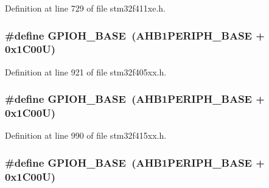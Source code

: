 Definition at line 729 of file stm32f411xe.\+h.

\subsubsection[{\texorpdfstring{G\+P\+I\+O\+H\+\_\+\+B\+A\+SE}{GPIOH_BASE}}]{\setlength{\rightskip}{0pt plus 5cm}\#define G\+P\+I\+O\+H\+\_\+\+B\+A\+SE~({\bf A\+H\+B1\+P\+E\+R\+I\+P\+H\+\_\+\+B\+A\+SE} + 0x1\+C00\+U)}\hypertarget{group___peripheral__registers__structures_gaee4716389f3a1c727495375b76645608}{}\label{group___peripheral__registers__structures_gaee4716389f3a1c727495375b76645608}


Definition at line 921 of file stm32f405xx.\+h.

\subsubsection[{\texorpdfstring{G\+P\+I\+O\+H\+\_\+\+B\+A\+SE}{GPIOH_BASE}}]{\setlength{\rightskip}{0pt plus 5cm}\#define G\+P\+I\+O\+H\+\_\+\+B\+A\+SE~({\bf A\+H\+B1\+P\+E\+R\+I\+P\+H\+\_\+\+B\+A\+SE} + 0x1\+C00\+U)}\hypertarget{group___peripheral__registers__structures_gaee4716389f3a1c727495375b76645608}{}\label{group___peripheral__registers__structures_gaee4716389f3a1c727495375b76645608}


Definition at line 990 of file stm32f415xx.\+h.

\subsubsection[{\texorpdfstring{G\+P\+I\+O\+H\+\_\+\+B\+A\+SE}{GPIOH_BASE}}]{\setlength{\rightskip}{0pt plus 5cm}\#define G\+P\+I\+O\+H\+\_\+\+B\+A\+SE~({\bf A\+H\+B1\+P\+E\+R\+I\+P\+H\+\_\+\+B\+A\+SE} + 0x1\+C00\+U)}\hypertarget{group___peripheral__registers__structures_gaee4716389f3a1c727495375b76645608}{}\label{group___peripheral__registers__structures_gaee4716389f3a1c727495375b76645608}



